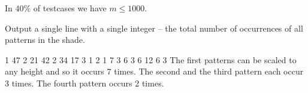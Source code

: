 \smallskip

In $40\%$ of testcases we have $m \leq 1000$.


Output a single line with a single integer
-- the total number of occurrences of all patterns in the shade.


1 47
2 21 42
2 34 17
3 1 2 1
7 3 6 3 6 12 6 3
\sampleCOMMENT
The first patterns can be scaled to any height and so it occurs 7 times.
The second and the third pattern each occur 3 times.
The fourth pattern occurs 2 times.
\sampleEND



